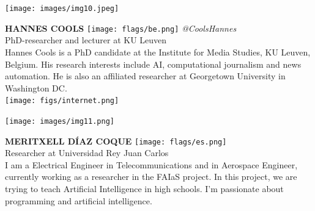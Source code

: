 \documentclass[11pt]{article}
\begin{document}
\noindent
\begin{minipage}{0.3\textwidth}
\centering
\texttt{[image: images/img10.jpeg]}
\end{minipage}
\hfill
\begin{minipage}{0.6\textwidth}\raggedright
\color{color1}\uppercase{\textbf{Hannes Cools}}
\color{color2}\hspace{0.2cm}\texttt{[image: flags/be.png]}
\hspace{0.2cm}\textit{@CoolsHannes}
\\
PhD-researcher and lecturer at KU Leuven\\
{\footnotesize 
Hannes Cools is a PhD candidate at the Institute for Media Studies, KU Leuven, Belgium. His research interests include AI, computational journalism and news automation. He is also an affiliated researcher at Georgetown University in Washington DC. }\\
\texttt{[image: figs/internet.png]}
\end{minipage}
\newline\newline\newline

\noindent
\begin{minipage}{0.3\textwidth}
\centering
\texttt{[image: images/img11.png]}
\end{minipage}
\hfill
\begin{minipage}{0.6\textwidth}\raggedright
\color{color1}\uppercase{\textbf{Meritxell Díaz Coque}}
\color{color2}\hspace{0.2cm}\texttt{[image: flags/es.png]}
\\
Researcher at Universidad Rey Juan Carlos\\
{\footnotesize I am a Electrical Engineer in Telecommunications and in Aerospace Engineer, currently working as a researcher in the FAIaS project. In this project, we are trying to teach Artificial Intelligence in high schools. I'm passionate about programming and artificial intelligence.}\\
\end{minipage}
\newline\newline\newline
\end{document}
